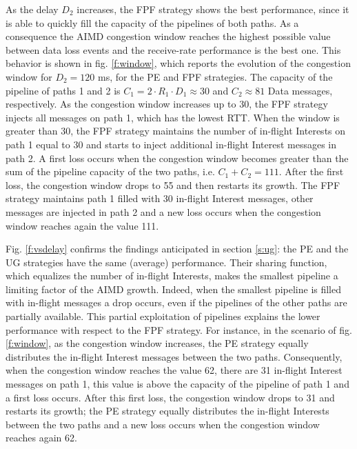 \documentclass{sig-alternate-10pt}
\begin{document}
As the delay $D_2$ increases, the FPF strategy shows the best performance, since it is able to quickly fill the capacity of the pipelines of both paths. As a consequence the AIMD congestion window reaches the highest possible value between data loss events and the receive-rate performance is the best one. This behavior is shown in fig. \ref{f:window}, which reports the evolution of the congestion window for $D_2=120$ ms, for the PE and FPF strategies. The capacity of the pipeline of paths 1 and 2 is $C_1 = 2 \cdot R_1 \cdot D_1\approx 30$ and $C_2 \approx 81$ Data messages, respectively.  As the congestion window increases up to 30, the FPF strategy injects all messages on path 1, which has the lowest RTT. When the window is greater than 30, the FPF strategy maintains the number of in-flight Interests on path 1 equal to 30 and starts to inject additional in-flight Interest messages in path 2. A first loss occurs when the congestion window becomes greater than the sum of the pipeline capacity of the two paths, i.e. $C_1+C_2=111$. After the first loss, the congestion window drops to 55 and then restarts its growth. The FPF strategy maintains path 1 filled with 30 in-flight Interest messages, other messages are injected in path 2 and a new loss occurs when the congestion window reaches again the value 111.


Fig. \ref{f:vsdelay} confirms the findings anticipated in section \ref{s:ug}: the PE and the UG strategies have the same (average) performance. Their sharing function, which equalizes the number of in-flight Interests, makes the smallest pipeline a limiting factor of the AIMD growth. Indeed, when the smallest pipeline is filled with in-flight messages a drop occurs, even if the pipelines of the other paths are partially available. This partial exploitation of pipelines explains the lower performance with respect to the FPF strategy. For instance, in the scenario of fig. \ref{f:window}, as the congestion window increases, the PE strategy equally distributes the in-flight Interest messages between the two paths. Consequently, when the congestion window reaches the value 62,  there are 31 in-flight Interest messages on path 1, this value is above the capacity of the pipeline of path 1 and a first loss occurs. After this first loss, the congestion window drops to 31 and restarts its growth; the PE strategy equally distributes the in-flight Interests between the two paths and a new loss occurs when the congestion window reaches again 62.
\end{document}
